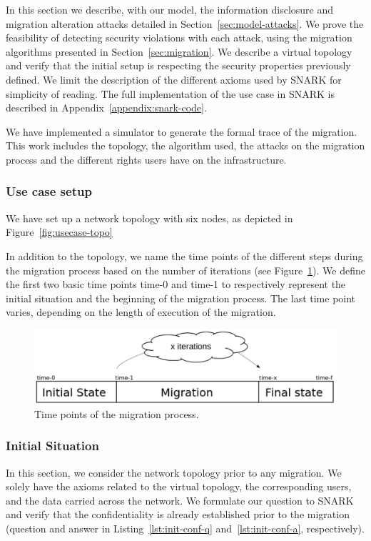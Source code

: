 \label{sec:model-usecase}
In this section we describe, with our model, the information disclosure and migration alteration attacks detailed in Section~\ref{sec:model-attacks}.
We prove the feasibility of detecting security violations with each attack, using the migration algorithms presented in Section~\ref{sec:migration}.
We describe a virtual topology and verify that the initial setup is respecting the security properties previously defined.
We limit the description of the different axioms used by SNARK for simplicity of reading.
The full implementation of the use case in SNARK is described in Appendix~\ref{appendix:snark-code}.

We have implemented a simulator to generate the formal trace of the migration.
This work includes the topology, the algorithm used, the attacks on the migration process and the different rights users have on the infrastructure.

\subsubsection{Use case setup}
We have set up a network topology with six nodes, as depicted in Figure~\ref{fig:usecase-topo}




In addition to the topology, we name the time points of the different steps during the migration process based on the number of iterations (see Figure~\ref{fig:time-points}).
We define the first two basic time points time-0 and time-1 to respectively represent the initial situation and the beginning of the migration process. The last time point varies, depending on the length of execution of the migration.


\begin{figure}[htbp]
\centering
\includegraphics[scale=0.5]{figures/time-points-evolution} 
\caption{Time points of the migration process.\label{fig:time-points}}
\end{figure}

\subsubsection{Initial Situation}
In this section, we consider the network topology prior to any migration.
We solely have the axioms related to the virtual topology, the corresponding users, and the data carried across the network.
We formulate our question to SNARK and verify that the confidentiality is already established prior to the migration (question and answer in Listing~\ref{lst:init-conf-q} and~\ref{lst:init-conf-a}, respectively).


